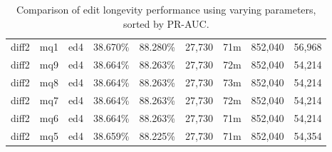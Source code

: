 \begin{sidewaystable}[!ph]
\begin{center}
\begin{tabular}{|c|c|c||c|c||c|c|c|c|}
diff2 & mq1 & ed4 & 38.670\% & 88.280\% & 27,730 & 71m & 852,040 & 56,968 \\
diff2 & mq9 & ed4 & 38.664\% & 88.263\% & 27,730 & 72m & 852,040 & 54,214 \\
diff2 & mq8 & ed4 & 38.664\% & 88.263\% & 27,730 & 73m & 852,040 & 54,214 \\
diff2 & mq7 & ed4 & 38.664\% & 88.263\% & 27,730 & 72m & 852,040 & 54,214 \\
diff2 & mq6 & ed4 & 38.664\% & 88.263\% & 27,730 & 71m & 852,040 & 54,214 \\
diff2 & mq5 & ed4 & 38.659\% & 88.225\% & 27,730 & 71m & 852,040 & 54,354 \\
\hline
\end{tabular}
\end{center}
\caption{Comparison of edit longevity performance using
    varying parameters, sorted by PR-AUC.}
\label{tab:editshoutG}
\end{sidewaystable}
\clearpage
